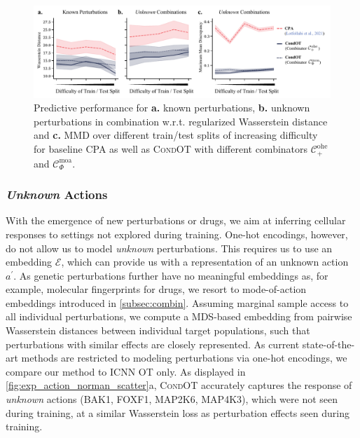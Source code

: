 \begin{figure}[t]
    \includegraphics[width=1.1\textwidth]{figures/fig_action_comb_comparison_metrics.pdf}
    \caption{Predictive performance for \textbf{a.} known perturbations, \textbf{b.} unknown perturbations in combination w.r.t. regularized Wasserstein distance and \textbf{c.} MMD over different train/test splits of increasing difficulty for baseline \textsc{CPA} as well as \textsc{CondOT} with different combinators $\mathcal{C}^\text{ohe}_+$ and $\mathcal{C}^\text{moa}_\Phi$.}
    \label{fig:exp_action_norman_line}
\end{figure}


\subsubsection{\textit{Unknown} Actions}
\label{sec:eval_action_unknown}

 With the emergence of new perturbations or drugs, we aim at inferring cellular responses to settings not explored during training.
One-hot encodings, however, do not allow us to model \emph{unknown} perturbations. 
This requires us to use an embedding $\mathcal{E}$, which can provide us with a representation of an unknown action $a^\prime$.
As genetic perturbations further have no meaningful embeddings as, for example, molecular fingerprints for drugs, we resort to mode-of-action embeddings introduced in \cref{subsec:combin}. Assuming marginal sample access to all individual perturbations, we compute a \acrfull{MDS}-based embedding from pairwise Wasserstein distances between individual target populations, such that perturbations with similar effects are closely represented. 
As current state-of-the-art methods are restricted to modeling perturbations via one-hot encodings, we compare our method to \textsc{ICNN OT} only. As displayed in \cref{fig:exp_action_norman_scatter}a, \textsc{CondOT} accurately captures the response of \emph{unknown} actions (BAK1, FOXF1, MAP2K6, MAP4K3), which were not seen during training, at a similar Wasserstein loss as perturbation effects seen during training.
 
